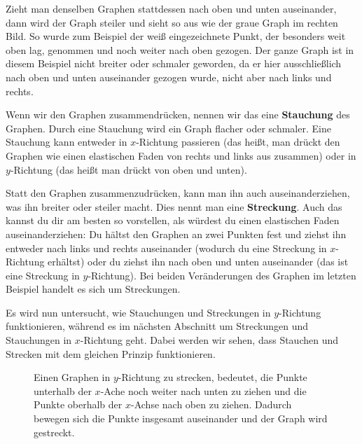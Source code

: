 \documentclass[../../main.tex]{subfiles}
\begin{document}
\begin{example}
    Zieht man denselben Graphen stattdessen nach oben und unten auseinander, dann wird der Graph steiler und sieht so aus wie der graue Graph im rechten Bild. So wurde zum Beispiel der weiß eingezeichnete Punkt, der besonders weit oben lag, genommen und noch weiter nach oben gezogen. Der ganze Graph ist in diesem Beispiel nicht breiter oder schmaler geworden, da er hier ausschließlich nach oben und unten auseinander gezogen wurde, nicht aber nach links und rechts.
\end{example}

Wenn wir den Graphen zusammendrücken, nennen wir das eine \textbf{Stauchung} des Graphen. Durch eine Stauchung wird ein Graph flacher oder schmaler. Eine Stauchung kann entweder in $x$-Richtung passieren (das heißt, man drückt den Graphen wie einen elastischen Faden von rechts und links aus zusammen) oder in $y$-Richtung (das heißt man drückt von oben und unten).

Statt den Graphen zusammenzudrücken, kann man ihn auch auseinanderziehen, was ihn breiter oder steiler macht. Dies nennt man eine \textbf{Streckung}. Auch das kannst du dir am besten so vorstellen, als würdest du einen elastischen Faden auseinanderziehen: Du hältst den Graphen an zwei Punkten fest und ziehst ihn entweder nach links und rechts auseinander (wodurch du eine Streckung in $x$-Richtung erhältst) oder du ziehst ihn nach oben und unten auseinander (das ist eine Streckung in $y$-Richtung). Bei beiden Veränderungen des Graphen im letzten Beispiel handelt es sich um Streckungen.

Es wird nun untersucht, wie Stauchungen und Streckungen in $y$-Richtung funktionieren, während es im nächsten Abschnitt um Streckungen und Stauchungen in $x$-Richtung geht. Dabei werden wir sehen, dass Stauchen und Strecken mit dem gleichen Prinzip funktionieren.


\begin{figure}[ht]
    \centering
    \caption{Einen Graphen in $y$-Richtung zu strecken, bedeutet, die Punkte unterhalb der $x$-Ache noch weiter nach unten zu ziehen und die Punkte oberhalb der $x$-Achse nach oben zu ziehen. Dadurch bewegen sich die Punkte insgesamt auseinander und der Graph wird gestreckt.}
\end{figure}
\end{document}
